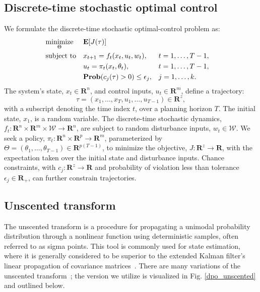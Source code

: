 \subsection{Discrete-time stochastic optimal control}
We formulate the discrete-time stochastic optimal-control problem as: 
\begin{align}
	& \underset{\Theta}{\mbox{minimize}} && \mathbf{E} [ J(\tau) ] \label{dpo_policy_opt}\\
	& \mbox{subject to} && x_{t+1} = f_t(x_t,u_t, w_t),&& t = 1,\dots,T-1, \notag\\
	& && u_t = \pi_t(x_t, \theta_t), && t = 1,\dots,T-1, \notag\\
	& && \mathbf{Prob} (c_j(\tau) > 0 ) \leq \epsilon_j, && j = 1,\dots,k. \notag
\end{align}
The system's state, $x_t \in \mathbf{R}^{n}$, and control inputs, $u_t \in \mathbf{R}^{m}$, define a trajectory:
\begin{equation}
\tau = (x_1,\dots,x_T,u_1,\dots,u_{T-1}) \in \mathbf{R}^z,
\end{equation}
with a subscript denoting the time index $t$, over a planning horizon $T$. The initial state, $x_1$, is a random variable. The discrete-time stochastic dynamics, $f_t : \mathbf{R}^n \times \mathbf{R}^m \times \mathcal{W} \rightarrow \mathbf{R}^n$, are subject to random disturbance inputs, $w_t \in \mathcal{W}$. We seek a policy, $\pi_t : \mathbf{R}^n \times \mathbf{R}^p \rightarrow \mathbf{R}^m$, parameterized by $\Theta = (\theta_1, \dots, \theta_{T-1}) \in \mathbf{R}^{p(T-1)}$, to minimize the objective, $J : \mathbf{R}^z \rightarrow \mathbf{R}$, with the expectation taken over the initial state and disturbance inputs. Chance constraints, with $c_j : \mathbf{R}^z \rightarrow \mathbf{R}$ and probability of violation less than tolerance $\epsilon_j \in \mathbf{R_{+}}$, can further constrain trajectories.

\subsection{Unscented transform} \label{dpo_ut}

The unscented transform is a procedure for propagating a unimodal probability distribution through a nonlinear function using deterministic samples, often referred to as sigma points. This tool is commonly used for state estimation, where it is generally considered to be superior to the extended Kalman filter's linear propagation of covariance matrices~\cite{uhlmann1995dynamic}. There are many variations of the unscented transform~\cite{menegaz2015systematization}; the version we utilize is visualized in Fig. \ref{dpo_unscented} and outlined below.

